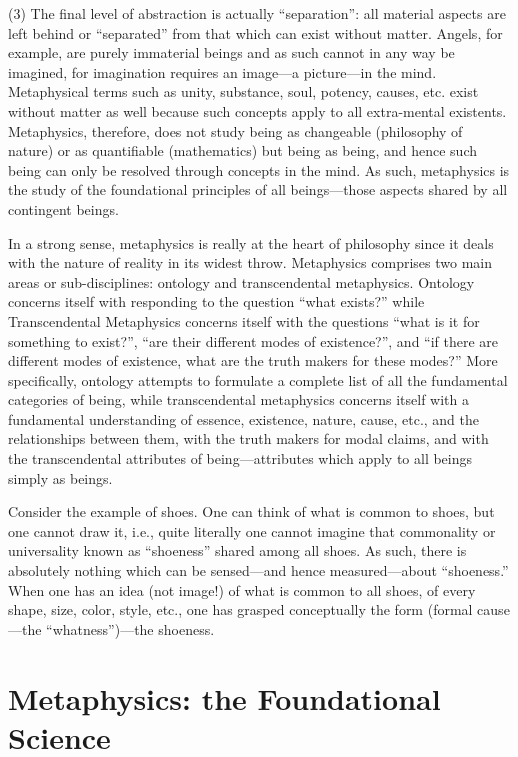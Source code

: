 (3) The final level of abstraction is actually ``separation'': all material aspects are left behind or ``separated'' from that which can exist without matter. Angels, for example, are purely immaterial beings and as such cannot in any way be imagined, for imagination requires an image---a picture---in the mind. Metaphysical terms such as unity, substance, soul, potency, causes, etc. exist without matter as well because such concepts apply to all extra-mental existents. Metaphysics, therefore, does not study being as changeable (philosophy of nature) or as quantifiable (mathematics) but being as being, and hence such being can only be resolved through concepts in the mind. As such, metaphysics is the study of the foundational principles of all beings---those aspects shared by all contingent beings.

In a strong sense, metaphysics is really at the heart of philosophy since it deals with the nature of reality in its widest throw. Metaphysics comprises two main areas or sub-disciplines: ontology and transcendental metaphysics. Ontology concerns itself with responding to the question ``what exists?'' while Transcendental Metaphysics concerns itself with the questions ``what is it for something to exist?'', ``are their different modes of existence?'', and ``if there are different modes of existence, what are the truth makers for these modes?'' More specifically, ontology attempts to formulate a complete list of all the fundamental categories of being, while transcendental metaphysics concerns itself with a fundamental understanding of essence, existence, nature, cause, etc., and the relationships between them, with the truth makers for modal claims, and with the transcendental attributes of being---attributes which apply to all beings simply as beings.

Consider the example of shoes. One can think of what is common to shoes, but one cannot draw it, i.e., quite literally one cannot imagine that commonality or universality known as ``shoeness'' shared among all shoes. As such, there is absolutely nothing which can be sensed---and hence measured---about ``shoeness.'' When one has an idea (not image!) of what is common to all shoes, of every shape, size, color, style, etc., one has grasped conceptually the form (formal cause---the ``whatness'')---the shoeness.

\section{Metaphysics: the Foundational Science}

